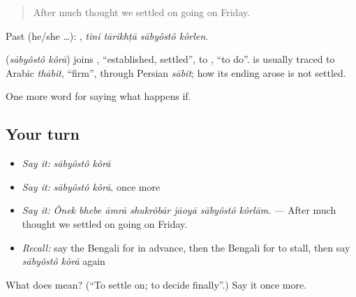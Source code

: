 \begin{quote}
After much thought we settled on going on Friday.
\end{quote}

Past (he/she …):    , \emph{tini tārikhṭā sābyôstô kôrlen}.

\begin{cousinweb}
\textbf{ } (\emph{sābyôstô kôrā}) joins , \textquotedblleft{}established, settled\textquotedblright{}, to , \textquotedblleft{}to do\textquotedblright{}.  is usually traced to Arabic \emph{thābit}, \textquotedblleft{}firm\textquotedblright{}, through Persian \emph{sābit}; how its ending arose is not settled.
\end{cousinweb}

\begin{grammarlens}[title={What you've built}]
One more word for saying what happens if.
\end{grammarlens}

\subsection*{Your turn}
\begin{itemize}
\raggedright
  \item \emph{Say it:} \emph{sābyôstô kôrā}
  \item \emph{Say it:} \emph{sābyôstô kôrā}, once more
  \item \emph{Say it:} \emph{Ônek bhebe āmrā shukrôbār jāoyā sābyôstô kôrlām.} — After much thought we settled on going on Friday.
  \item \emph{Recall:} say the Bengali for in advance, then the Bengali for to stall, then say \emph{sābyôstô kôrā} again
\end{itemize}

\begin{tcolorbox}[breakable,colback=teal!4,colframe=teal!35!black,title={Before you move on}]
What does   mean? (\textquotedblleft{}To settle on; to decide finally\textquotedblright{}.) Say it once more.
\end{tcolorbox}
